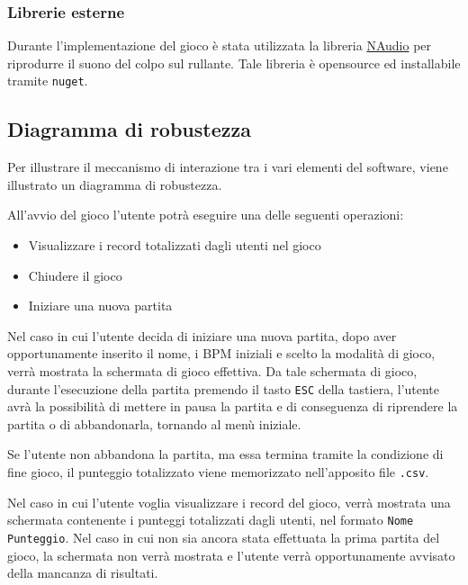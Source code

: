 \subsubsection{Librerie esterne}
Durante l'implementazione del gioco è stata utilizzata la libreria \hyperlink{https://github.com/naudio/NAudio}{NAudio} per riprodurre il suono del colpo sul rullante.
Tale libreria è opensource ed installabile tramite \texttt{nuget}.
\newpage
\subsection{Diagramma di robustezza}
Per illustrare il meccanismo di interazione tra i vari elementi del software, viene illustrato un diagramma di robustezza.

\vspace{1cm}
\begin{figure}[h]
\end{figure}
\vspace{1.5cm}
All'avvio del gioco l'utente potrà eseguire una delle seguenti operazioni:
\begin{itemize}
    \item Visualizzare i record totalizzati dagli utenti nel gioco
    \item Chiudere il gioco
    \item Iniziare una nuova partita
\end{itemize}
\vspace{1cm}
Nel caso in cui l'utente decida di iniziare una nuova partita, dopo aver opportunamente inserito il nome, i BPM iniziali e scelto la modalità di gioco, verrà mostrata la schermata di gioco effettiva. Da tale schermata di gioco, durante l'esecuzione della partita premendo il tasto \texttt{ESC} della tastiera, l'utente avrà la possibilità di mettere in pausa la partita e di conseguenza di riprendere la partita o di abbandonarla, tornando al menù iniziale.

Se l'utente non abbandona la partita, ma essa termina tramite la condizione di fine gioco, il punteggio totalizzato viene memorizzato nell'apposito file \texttt{.csv}.
\vspace{0.5cm}

Nel caso in cui l'utente voglia visualizzare i record del gioco, verrà mostrata una schermata contenente i punteggi totalizzati dagli utenti, nel formato \texttt{Nome Punteggio}. Nel caso in cui non sia ancora stata effettuata la prima partita del gioco, la schermata non verrà mostrata e l'utente verrà opportunamente avvisato della mancanza di risultati.

